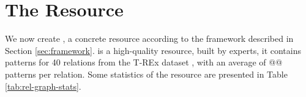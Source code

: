 \section{The \resource{} Resource}
\label{sec:rel-graph}

We now create \resource{}, a concrete resource according to the framework described in Section \ref{sec:framework}.
\resource{} is a high-quality resource, built by experts,
it contains patterns for 40 relations from the T-REx dataset \cite{trex}, with an average of @@ patterns per relation.
Some statistics of the resource are presented in Table \ref{tab:rel-graph-stats}.








